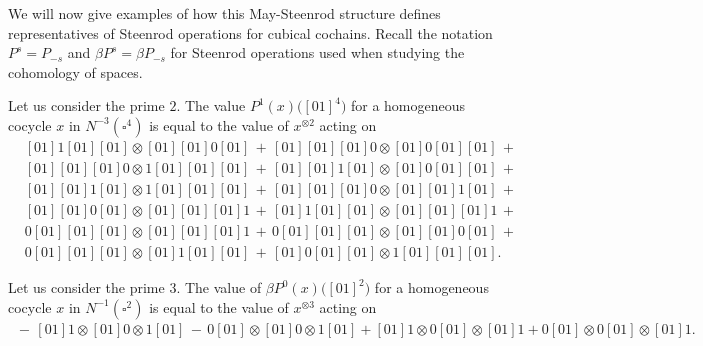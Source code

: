 We will now give examples of how this May-Steenrod structure defines representatives of Steenrod operations for cubical cochains.
Recall the notation $P^s = P_{-s}$ and $\beta P^s = \beta P_{-s}$ for Steenrod operations used when studying the cohomology of spaces.

\begin{example}
	Let us consider the prime $2$.
	The value $P^1(x)\big([01]^{4}\big)$ for a homogeneous cocycle $x$ in $N^{-3}(\square^4)$ is equal to the value of $x^{\otimes 2}$ acting on
	\begin{align*}&
	[01]1[01][01] \otimes [01][01]0[01]\,+\,
	[01][01][01]0 \otimes [01]0[01][01]\,+\, \\&
	[01][01][01]0 \otimes 1[01][01][01]\,+\,
	[01][01]1[01] \otimes [01]0[01][01]\,+\, \\&
	[01][01]1[01] \otimes 1[01][01][01]\,+\,
	[01][01][01]0 \otimes [01][01]1[01]\,+\, \\&
	[01][01]0[01] \otimes [01][01][01]1\,+\,
	[01]1[01][01] \otimes [01][01][01]1\,+\, \\&
	0[01][01][01] \otimes [01][01][01]1\,+\,
	0[01][01][01] \otimes [01][01]0[01]\,+\, \\&
	0[01][01][01] \otimes [01]1[01][01]\,+\,
	[01]0[01][01] \otimes 1[01][01][01].\,\phantom{+}\,
	\end{align*}
\end{example}

\begin{example}
	Let us consider the prime $3$.
	The value of $\beta P^0(x)\big([01]^2\big)$ for a homogeneous cocycle $x$ in $N^{-1}(\square^2)$ is equal to the value of $x^{\otimes 3}$ acting on
	\begin{align*}
	\,-\, [01]1 \otimes [01]0 \otimes 1[01] \,-\, 0[01] \otimes [01]0 \otimes 1[01] + [01]1 \otimes 0[01] \otimes [01]1 + 0[01] \otimes 0[01] \otimes [01]1.
	\end{align*}
\end{example}
